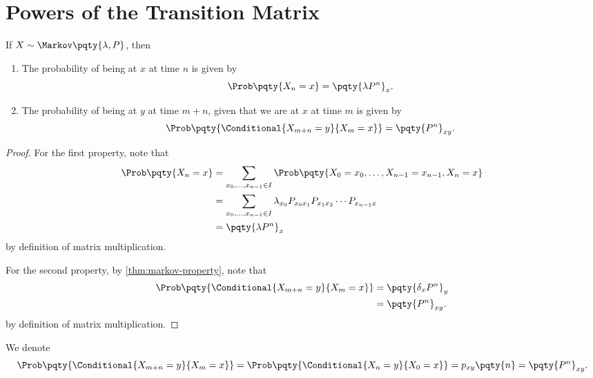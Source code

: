 \section{Powers of the Transition Matrix}

\begin{theorem}
    If \(X \sim \Markov\pqty{\lambda, P}\), then
    \begin{enumerate}[label=(\roman*)]
        \item The probability of being at \(x\) at time \(n\) is given by
        \[
            \Prob\pqty{X_n = x} = \pqty{\lambda P^n}_x.
        \]
        \item The probability of being at \(y\) at time \(m + n\), given that we are at \(x\) at time \(m\) is given by
        \[
            \Prob\pqty{\Conditional{X_{m + n} = y}{X_m = x}} = \pqty{P^n}_{xy}.
        \]
    \end{enumerate}
\end{theorem}

\begin{proof}
    For the first property, note that
    \begin{align*}
        \Prob\pqty{X_n = x} &= \sum_{x_0, \ldots, x_{n - 1} \in I} \Prob\pqty{X_0 = x_0, \ldots, X_{n - 1} = x_{n - 1}, X_n = x} \\
        &= \sum_{x_0, \ldots, x_{n - 1} \in I} \lambda_{x_0} P_{x_0 x_1} P_{x_1 x_2} \cdots P_{x_{n - 1} x} \\
        &= \pqty{\lambda P^n}_x
    \end{align*}
    by definition of matrix multiplication.


    For the second property, by \autoref{thm:markov-property}, note that
    \begin{align*}
        \Prob\pqty{\Conditional{X_{m + n} = y}{X_m = x}} &= \pqty{\delta_x P^n}_y \\
        &= \pqty{P^n}_{xy}.
    \end{align*}
    by definition of matrix multiplication.
\end{proof}

\begin{notation}
    We denote
    \[
    \Prob\pqty{\Conditional{X_{m + n} = y}{X_m = x}} = \Prob\pqty{\Conditional{X_n = y}{X_0 = x}} = p_{xy}\pqty{n} = \pqty{P^n}_{xy}.
    \]
\end{notation}

